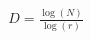 \documentclass[preview]{standalone}
\begin{document}
\begin{align*}
D = \frac{\log(N)}{\log(r)}
\end{align*}
\end{document}
